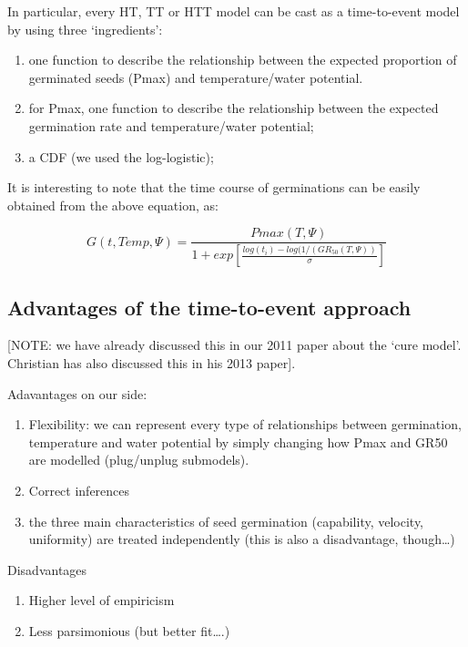 \documentclass[a4paper,12pt]{article}
\providecommand{\tightlist}{%
	\setlength{\itemsep}{0pt}\setlength{\parskip}{0pt}}
\begin{document}
In particular, every HT, TT or HTT model can be cast as a time-to-event
model by using three `ingredients':

\begin{enumerate}
\def\labelenumi{\arabic{enumi}.}
\tightlist
\item
  one function to describe the relationship between the expected
  proportion of germinated seeds (Pmax) and temperature/water potential.
\item
  for Pmax, one function to describe the relationship between the
  expected germination rate and temperature/water potential;
\item
  a CDF (we used the log-logistic);
\end{enumerate}

It is interesting to note that the time course of germinations can be
easily obtained from the above equation, as:

\begin{equation}
G(t, Temp, \Psi) = \frac{Pmax(T, \Psi)}{1 + exp\left[\frac{log(t_i)-log(1/(GR_{50}(T,\Psi))}{\sigma} \right] }
\end{equation}

\subsection{Advantages of the time-to-event
approach}\label{advantages-of-the-time-to-event-approach}

{[}NOTE: we have already discussed this in our 2011 paper about the
`cure model'. Christian has also discussed this in his 2013 paper{]}.

Adavantages on our side:

\begin{enumerate}
\def\labelenumi{\arabic{enumi}.}
\tightlist
\item
  Flexibility: we can represent every type of relationships between
  germination, temperature and water potential by simply changing how
  Pmax and GR50 are modelled (plug/unplug submodels).
\item
  Correct inferences
\item
  the three main characteristics of seed germination (capability,
  velocity, uniformity) are treated independently (this is also a
  disadvantage, though\ldots{})
\end{enumerate}

Disadvantages

\begin{enumerate}
\def\labelenumi{\arabic{enumi}.}
\tightlist
\item
  Higher level of empiricism
\item
  Less parsimonious (but better fit\ldots{}.)
\end{enumerate}
\end{document}
